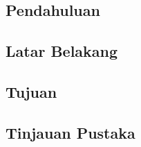 \begin{multicols}{2}
\tableofcontents
\section{Pendahuluan}
\lipsum[1]\cite{Bowker1985}
\subsection{Latar Belakang}
\lipsum[1]
\subsection{Tujuan}
\lipsum[1]
\subsection{Tinjauan Pustaka}
\lipsum[1]
\end{multicols}